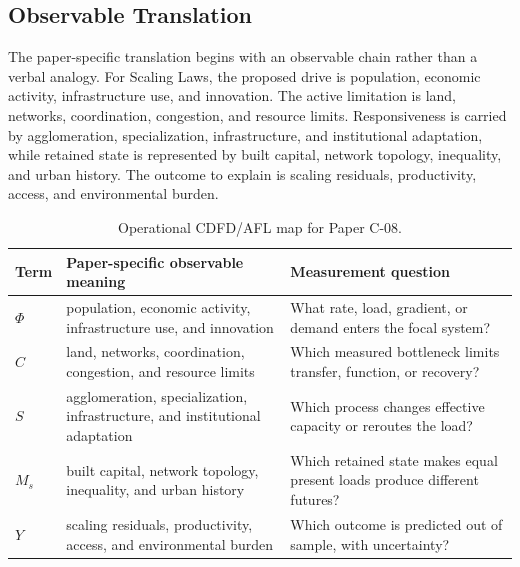 \documentclass[11pt,a4paper]{article}
\begin{document}
\subsection{Observable Translation}

The paper-specific translation begins with an observable chain rather than a
verbal analogy. For Scaling Laws, the proposed drive is population, economic activity, infrastructure use, and innovation.
The active limitation is land, networks, coordination, congestion, and resource limits. Responsiveness is carried by
agglomeration, specialization, infrastructure, and institutional adaptation, while retained state is represented by
built capital, network topology, inequality, and urban history. The outcome to explain is scaling residuals, productivity, access, and environmental burden.

\begin{table}[htbp]
\centering
\small
\caption{Operational CDFD/AFL map for Paper C-08.}
\begin{tabularx}{\textwidth}{|l|X|X|}
\hline
\textbf{Term} & \textbf{Paper-specific observable meaning} & \textbf{Measurement question} \\
\hline
$\Phi$ & population, economic activity, infrastructure use, and innovation & What rate, load, gradient, or demand enters the focal system? \\
\hline
$C$ & land, networks, coordination, congestion, and resource limits & Which measured bottleneck limits transfer, function, or recovery? \\
\hline
$S$ & agglomeration, specialization, infrastructure, and institutional adaptation & Which process changes effective capacity or reroutes the load? \\
\hline
$M_s$ & built capital, network topology, inequality, and urban history & Which retained state makes equal present loads produce different futures? \\
\hline
$Y$ & scaling residuals, productivity, access, and environmental burden & Which outcome is predicted out of sample, with uncertainty? \\
\hline
\end{tabularx}
\end{table}
\end{document}
